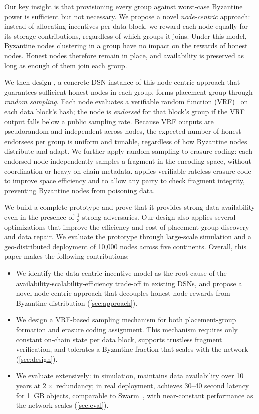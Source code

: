 Our key insight is that provisioning every group against worst-case Byzantine power is sufficient but not necessary.
We propose a novel \emph{node-centric} approach: instead of allocating incentives per data block, we reward each node equally for its storage contributions, regardless of which groups it joins.
Under this model, Byzantine nodes clustering in a group have no impact on the rewards of honest nodes.
Honest nodes therefore remain in place, and availability is preserved as long as enough of them join each group.

We then design \sys, a concrete DSN instance of this node-centric approach that guarantees sufficient honest nodes in each group.
\sys forms placement group through \emph{random sampling}.
Each node evaluates a verifiable random function (VRF)~\cite{vrf,vrf-rfc} on each data block's hash; the node is \emph{endorsed} for that block's group if the VRF output falls below a public sampling rate.
Because VRF outputs are pseudorandom and independent across nodes, the expected number of honest endorsees per group is uniform and tunable, regardless of how Byzantine nodes distribute and adapt.
We further apply random sampling to erasure coding: each endorsed node independently samples a fragment in the encoding space, without coordination or heavy on-chain metadata.
\sys applies verifiable rateless erasure code~\cite{verify-rateless-ec} to improve space efficiency and to allow any party to check fragment integrity, preventing Byzantine nodes from poisoning data.

We build a complete \sys prototype and prove that it provides strong data availability even in the presence of $\frac{1}{3}$ strong adversaries.
Our \sys design also applies several optimizations that improve the efficiency and cost of placement group discovery and data repair.
We evaluate the prototype through large-scale simulation and a geo-distributed deployment of 10,000 nodes across five continents.
Overall, this paper makes the following contributions:
\begin{itemize}
    \item We identify the data-centric incentive model as the root cause of the availability-scalability-efficiency trade-off in existing DSNs, and propose a novel node-centric approach that decouples honest-node rewards from Byzantine distribution (\cref{sec:approach}).
    \item We design a VRF-based sampling mechanism for both placement-group formation and erasure coding assignment.
    This mechanism requires only constant on-chain state per data block, supports trustless fragment verification, and tolerates a Byzantine fraction that scales with the network (\cref{sec:design}).
    \item We evaluate \sys extensively: in simulation, \sys maintains data availability over 10 years at $2\times$ redundancy; in real deployment, \sys achieves 30--40 second latency for 1~GB objects, comparable to Swarm~\cite{swarm}, with near-constant performance as the network scales (\cref{sec:eval}).
\end{itemize}
